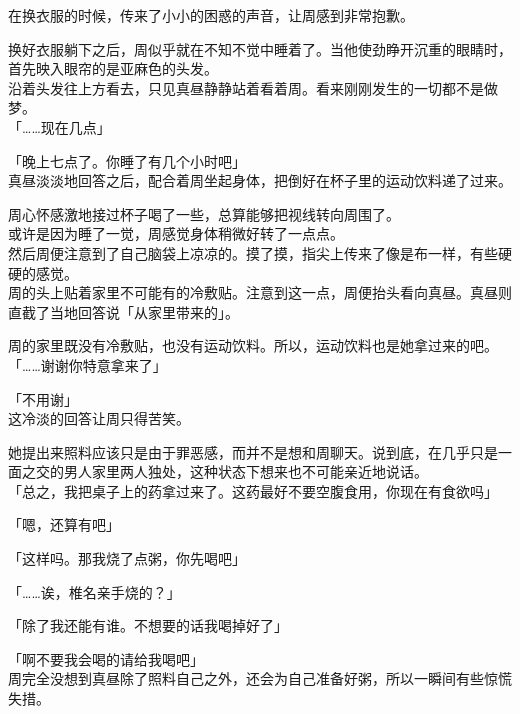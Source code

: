 在换衣服的时候，传来了小小的困惑的声音，让周感到非常抱歉。\\

\vspace{2\baselineskip}

换好衣服躺下之后，周似乎就在不知不觉中睡着了。当他使劲睁开沉重的眼睛时，首先映入眼帘的是亚麻色的头发。\\

沿着头发往上方看去，只见真昼静静站着看着周。看来刚刚发生的一切都不是做梦。\\

「……现在几点」

「晚上七点了。你睡了有几个小时吧」\\

真昼淡淡地回答之后，配合着周坐起身体，把倒好在杯子里的运动饮料递了过来。

周心怀感激地接过杯子喝了一些，总算能够把视线转向周围了。\\

或许是因为睡了一觉，周感觉身体稍微好转了一点点。\\

然后周便注意到了自己脑袋上凉凉的。摸了摸，指尖上传来了像是布一样，有些硬硬的感觉。\\

周的头上贴着家里不可能有的冷敷贴。注意到这一点，周便抬头看向真昼。真昼则直截了当地回答说「从家里带来的」。

周的家里既没有冷敷贴，也没有运动饮料。所以，运动饮料也是她拿过来的吧。\\

「……谢谢你特意拿来了」

「不用谢」\\

这冷淡的回答让周只得苦笑。

她提出来照料应该只是由于罪恶感，而并不是想和周聊天。说到底，在几乎只是一面之交的男人家里两人独处，这种状态下想来也不可能亲近地说话。\\

「总之，我把桌子上的药拿过来了。这药最好不要空腹食用，你现在有食欲吗」

「嗯，还算有吧」

「这样吗。那我烧了点粥，你先喝吧」

「……诶，椎名亲手烧的？」

「除了我还能有谁。不想要的话我喝掉好了」

「啊不要我会喝的请给我喝吧」\\

周完全没想到真昼除了照料自己之外，还会为自己准备好粥，所以一瞬间有些惊慌失措。

